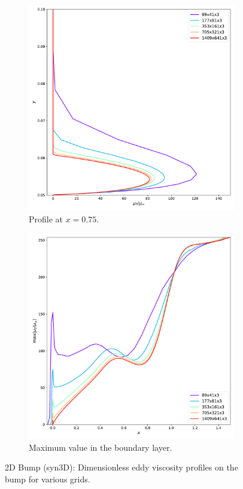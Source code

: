 \begin{figure}[ht!]
\centering
\begin{subfigure}{.45\textwidth}
  \centering
  \includegraphics[width=1.0\textwidth]{figs/2dbump/revBLGridStudy.pdf}
  \caption{Profile at $x=0.75$.}
\end{subfigure}%
\begin{subfigure}{.45\textwidth}
  \centering
  \includegraphics[width=1.0\textwidth]{figs/2dbump/maxRevstudy.pdf}
  \caption{Maximum value in the boundary layer.}
\end{subfigure}
\caption{2D Bump (syn3D): Dimensionless eddy viscosity profiles on the bump for various grids.}
\label{fig:syn2dbumpmutstudy}
\end{figure}

